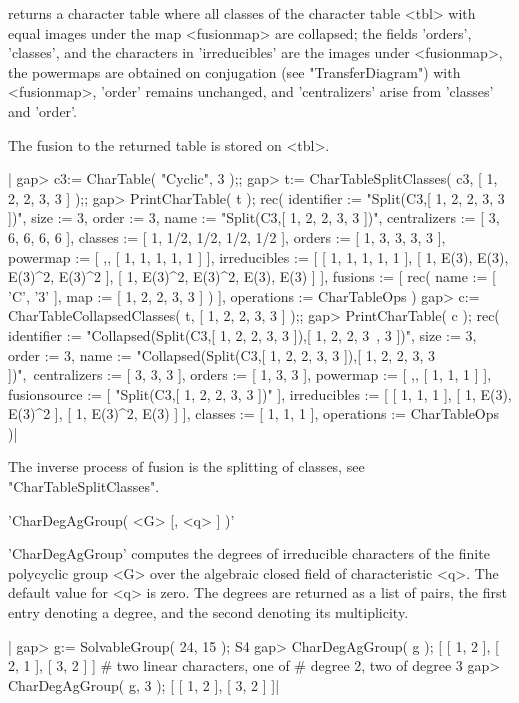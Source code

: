 returns a character table where all classes of the character table <tbl>
with equal images under the map <fusionmap> are collapsed;
the fields 'orders', 'classes', and the characters in 'irreducibles' are
the images under <fusionmap>, the powermaps are obtained on conjugation
(see "TransferDiagram") with <fusionmap>, 'order' remains unchanged,
and 'centralizers' arise from 'classes' and 'order'.

The fusion to the returned table is stored on <tbl>.

|    gap> c3:= CharTable( "Cyclic", 3 );;
    gap> t:= CharTableSplitClasses( c3, [ 1, 2, 2, 3, 3 ] );;
    gap> PrintCharTable( t );
    rec( identifier := "Split(C3,[ 1, 2, 2, 3, 3 ])", size := 3, order :=
    3, name := "Split(C3,[ 1, 2, 2, 3, 3 ])", centralizers :=
    [ 3, 6, 6, 6, 6 ], classes := [ 1, 1/2, 1/2, 1/2, 1/2 ], orders :=
    [ 1, 3, 3, 3, 3 ], powermap := [ ,, [ 1, 1, 1, 1, 1 ]
     ], irreducibles :=
    [ [ 1, 1, 1, 1, 1 ], [ 1, E(3), E(3), E(3)^2, E(3)^2 ],
      [ 1, E(3)^2, E(3)^2, E(3), E(3) ] ], fusions := [ rec(
          name := [ 'C', '3' ],
          map := [ 1, 2, 2, 3, 3 ] ) ], operations := CharTableOps )
    gap> c:= CharTableCollapsedClasses( t, [ 1, 2, 2, 3, 3 ] );;
    gap> PrintCharTable( c );
    rec( identifier := "Collapsed(Split(C3,[ 1, 2, 2, 3, 3 ]),[ 1, 2, 2, 3\
    , 3 ])", size := 3, order :=
    3, name := "Collapsed(Split(C3,[ 1, 2, 2, 3, 3 ]),[ 1, 2, 2, 3, 3 ])",\
     centralizers := [ 3, 3, 3 ], orders := [ 1, 3, 3 ], powermap :=
    [ ,, [ 1, 1, 1 ] ], fusionsource := [ "Split(C3,[ 1, 2, 2, 3, 3 ])"
     ], irreducibles := [ [ 1, 1, 1 ], [ 1, E(3), E(3)^2 ],
      [ 1, E(3)^2, E(3) ] ], classes :=
    [ 1, 1, 1 ], operations := CharTableOps )|

The inverse process of fusion is the splitting of classes, see
"CharTableSplitClasses".


'CharDegAgGroup( <G> [, <q> ] )'

'CharDegAgGroup'  computes  the  degrees of irreducible   characters
of  the finite polycyclic group  <G> over the algebraic closed field of
characteristic <q>.  The default value for <q> is zero.
The degrees are returned as a list of pairs, the first entry  denoting a
degree,  and  the  second  denoting  its multiplicity.

|    gap> g:= SolvableGroup( 24, 15 );
    S4
    gap> CharDegAgGroup( g );
    [ [ 1, 2 ], [ 2, 1 ], [ 3, 2 ] ]    # two linear characters, one of
                                        # degree 2, two of degree 3
    gap> CharDegAgGroup( g, 3 );
    [ [ 1, 2 ], [ 3, 2 ] ]|

